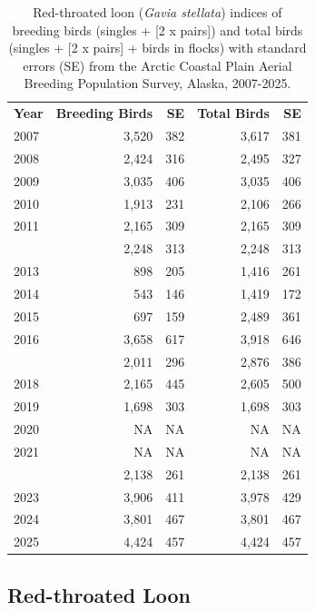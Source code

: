 \documentclass[
]{article}
\begin{document}
\begin{longtable}[t]{lrrrr}

\caption{\label{tbl-RTLO}Red-throated loon (\emph{Gavia stellata})
indices of breeding birds (singles + {[}2 x pairs{]}) and total birds
(singles + {[}2 x pairs{]} + birds in flocks) with standard errors (SE)
from the Arctic Coastal Plain Aerial Breeding Population Survey, Alaska,
2007-2025.}

\tabularnewline

\\
\toprule
\textbf{Year} & \textbf{Breeding Birds} & \textbf{SE} & \textbf{Total Birds} & \textbf{SE}\\
\midrule
2007 & 3,520 & 382 & 3,617 & 381\\
2008 & 2,424 & 316 & 2,495 & 327\\
2009 & 3,035 & 406 & 3,035 & 406\\
2010 & 1,913 & 231 & 2,106 & 266\\
2011 & 2,165 & 309 & 2,165 & 309\\
\addlinespace
2012 & 2,248 & 313 & 2,248 & 313\\
2013 & 898 & 205 & 1,416 & 261\\
2014 & 543 & 146 & 1,419 & 172\\
2015 & 697 & 159 & 2,489 & 361\\
2016 & 3,658 & 617 & 3,918 & 646\\
\addlinespace
2017 & 2,011 & 296 & 2,876 & 386\\
2018 & 2,165 & 445 & 2,605 & 500\\
2019 & 1,698 & 303 & 1,698 & 303\\
2020 & NA & NA & NA & NA\\
2021 & NA & NA & NA & NA\\
\addlinespace
2022 & 2,138 & 261 & 2,138 & 261\\
2023 & 3,906 & 411 & 3,978 & 429\\
2024 & 3,801 & 467 & 3,801 & 467\\
2025 & 4,424 & 457 & 4,424 & 457\\
\bottomrule

\end{longtable}

\endgroup{}

\newpage{}

\subsection*{Red-throated Loon}\label{red-throated-loon-2}
\end{document}

